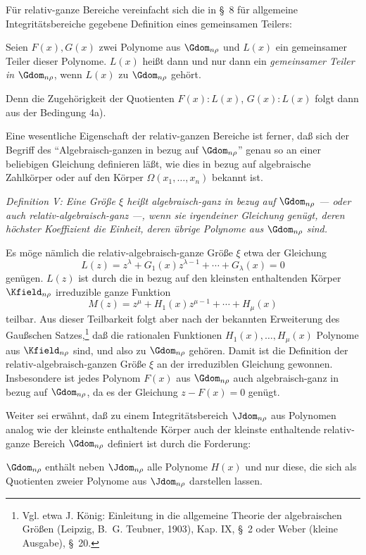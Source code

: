 \documentclass[11pt]{article}
\begin{document}
Für relativ-ganze Bereiche vereinfacht sich die in \S\ 8 für allgemeine Integritätsbereiche gegebene Definition eines gemeinsamen Teilers:

Seien $F(x),G(x)$ zwei Polynome aus $\Gdom_{n\rho}$ und $L(x)$ ein gemeinsamer Teiler dieser Polynome. $L(x)$ heißt dann und nur dann ein \emph{gemeinsamer Teiler in $\Gdom_{n\rho}$}, wenn $L(x)$ zu $\Gdom_{n\rho}$ gehört.

Denn die Zugehörigkeit der Quotienten $F(x):L(x)$, $G(x):L(x)$ folgt dann aus der Bedingung 4a).

Eine wesentliche Eigenschaft der relativ-ganzen Bereiche ist ferner, daß sich der Begriff des ``Algebraisch-ganzen in bezug auf $\Gdom_{n\rho}$'' genau so an einer beliebigen Gleichung definieren läßt, wie dies in bezug auf algebraische Zahlkörper oder auf den Körper $\Omega(x_1,
\ldots,x_n)$ bekannt ist.

\emph{Definition V: Eine Größe $\xi$ heißt algebraisch-ganz in bezug auf $\Gdom_{n\rho}$ --- oder auch relativ-algebraisch-ganz ---, wenn sie irgendeiner Gleichung genügt, deren höchster Koeffizient die Einheit, deren übrige Polynome aus $\Gdom_{n\rho}$ sind.}

Es möge nämlich die relativ-algebraisch-ganze Größe $\xi$ etwa der Gleichung
\[
  L(z)=z^\lambda+G_1(x)z^{\lambda-1}+\cdots+G_\lambda(x)=0
\]
genügen. $L(z)$ ist durch die in bezug auf den kleinsten enthaltenden Körper $\Kfield_{n\rho}$ irreduzible ganze Funktion
\[
  M(z)=z^\mu+H_1(x)z^{\mu-1}+\cdots+H_\mu(x)
\]
teilbar. Aus dieser Teilbarkeit folgt aber nach der bekannten Erweiterung des Gaußschen Satzes,\footnote{Vgl. etwa J. König: Einleitung in die allgemeine Theorie der algebraischen Größen (Leipzig, B.~G. Teubner, 1903), Kap. IX, \S\ 2 oder Weber (kleine Ausgabe), \S\ 20.} daß die rationalen Funktionen $H_1(x),\ldots,H_\mu(x)$ Polynome aus $\Kfield_{n\rho}$ sind, und also zu $\Gdom_{n\rho}$ gehören. Damit ist die Definition der relativ-algebraisch-ganzen Größe $\xi$ an der irreduziblen Gleichung gewonnen. Insbesondere ist jedes Polynom $F(x)$ aus $\Gdom_{n\rho}$ auch algebraisch-ganz in bezug auf $\Gdom_{n\rho}$, da es der Gleichung $z-F(x)=0$ genügt.

Weiter sei erwähnt, daß zu einem Integritätsbereich $\Jdom_{n\rho}$ aus Polynomen analog wie der kleinste enthaltende Körper auch der kleinste enthaltende relativ-ganze Bereich $\Gdom_{n\rho}$ definiert ist durch die Forderung:

$\Gdom_{n\rho}$ enthält neben $\Jdom_{n\rho}$ alle Polynome $H(x)$ und nur diese, die sich als Quotienten zweier Polynome aus $\Jdom_{n\rho}$ darstellen lassen.
\end{document}
